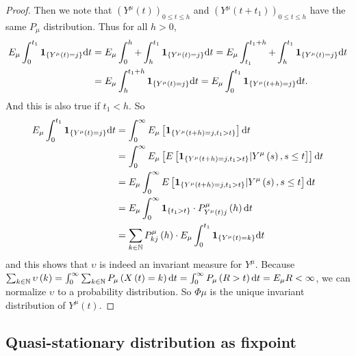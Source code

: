 \documentclass[12pt,a4paper]{scrartcl}
\numberwithin{equation}{section}
\newcommand{\N}{\mathbb{N}} %
\begin{document}
\begin{proof}
Then we note that $\left(Y^{\mu}\left(t\right)\right)_{0\leq t \leq h}$ and $\left(Y^{\mu}\left(t+t_1\right)\right)_{0\leq t \leq h}$ have the same $P_{\mu}$ distribution. Thus for all $h >0$,
\begin{align*}
E_{\mu} \int_{0}^{t_1} \textbf{1}_{\lbrace Y^{\mu}\left(t\right) = j\rbrace } \textnormal{d}t &= E_{\mu} \int_{0}^{h} + \int_{h}^{t_1} \textbf{1}_{\lbrace Y^{\mu}\left(t\right) = j\rbrace } \textnormal{d}t = E_{\mu} \int_{t_1}^{t_1+h} +   \int_{h}^{t_1}\textbf{1}_{\lbrace Y^{\mu}\left(t\right) = j\rbrace } \textnormal{d}t \\
&= E_{\mu} \int_{h}^{t_1+h} \textbf{1}_{\lbrace Y^{\mu}\left(t\right) = j\rbrace } \textnormal{d}t = E_{\mu} \int_{0}^{t_1} \textbf{1}_{\lbrace Y^{\mu}\left(t+h\right) = j\rbrace } \textnormal{d}t.
\end{align*}
And this is also true if $t_1 < h$. So
\begin{align*}
E_{\mu} \int_{0}^{t_1} \textbf{1}_{\lbrace Y^{\mu}\left(t\right) = j\rbrace } \textnormal{d}t &= \int_{0}^{\infty} E_{\mu}\left[\textbf{1}_{\lbrace Y^{\mu}\left(t+h\right) = j, t_1 > t\rbrace }\right]\textnormal{d}t \\
&= \int_{0}^{\infty} E_{\mu}\left[E\left[\textbf{1}_{\lbrace Y^{\mu}\left(t+h\right) = j, t_1 > t\rbrace }| Y^{\mu}\left(s\right), s \leq t \right]\right]\textnormal{d}t \\
&= E_{\mu} \int_{0}^{\infty} E\left[\textbf{1}_{\lbrace Y^{\mu}\left(t+h\right) = j, t_1 > t\rbrace }| Y^{\mu}\left(s\right), s \leq t \right]\textnormal{d}t \\
&= E_{\mu} \int_{0}^{\infty}\textbf{1}_{\lbrace t_1>t\rbrace } \cdot P_{Y^{\mu}\left(t\right)j}^{\mu}\left(h\right) \textnormal{d}t \\
&= \sum_{k \in \N} P_{kj}^{\mu}\left(h\right) \cdot E_{\mu} \int_{0}^{t_1} \textbf{1}_{\lbrace Y^{\mu}\left(t\right) = k\rbrace } \textnormal{d}t
\end{align*}
and this shows that $ \upsilon $ is indeed an invariant measure for $ Y^{\mu} $. Because $\sum_{k \in \N} \upsilon\left(k\right) = \int_{0}^{\infty} \sum_{k \in \N} P_{\mu}\left(X\left(t\right) = k\right) \textnormal{d}t = \int_{0}^{\infty} P_{\mu}\left(R > t\right) \textnormal{d}t = E_{\mu} R < \infty $, we can normalize $ \upsilon $ to a probability distribution.
So $\Phi\mu$ is the unique invariant distribution of $ Y^{\mu}\left(t\right) $.

\end{proof}

\subsection{Quasi-stationary distribution as fixpoint} \label{sq:fixpointsareqsd}
 
\end{document}
